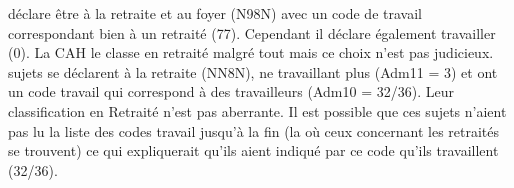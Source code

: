 \documentclass{book}
\begin{document}

\bigskip

 déclare être à la retraite et au foyer (N98N) avec un code de travail correspondant bien à un retraité (77). Cependant il déclare également travailler (0). La CAH le classe en retraité malgré tout mais ce choix n'est pas judicieux.\\

 sujets se déclarent à la retraite (NN8N), ne travaillant plus (Adm11 = 3) et ont un code travail qui correspond à des travailleurs (Adm10 = 32/36). Leur classification en Retraité n'est pas aberrante. Il est possible que ces sujets n'aient pas lu la liste des codes travail jusqu'à la fin (la où ceux concernant les retraités se trouvent) ce qui expliquerait qu'ils aient indiqué par ce code qu'ils travaillent (32/36).\\
\end{document}
